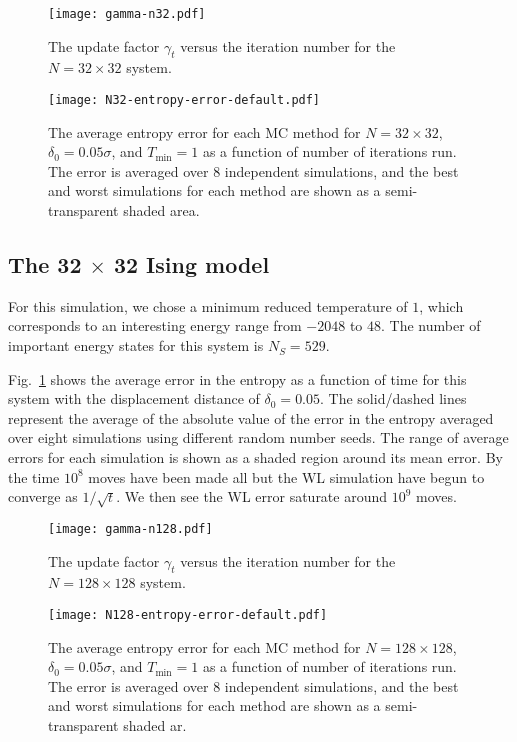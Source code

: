 \documentclass[letterpaper,twocolumn,amsmath,amssymb,pre,aps,10pt]{revtex4-1}
\begin{document}
\begin{figure}
\texttt{[image: gamma-n32.pdf]}
  \caption{
  The update factor $\gamma_t$ versus the iteration number for the $N=32 \times 32$
  system.}
\end{figure}

\begin{figure}
\texttt{[image: N32-entropy-error-default.pdf]}
  \caption{
  The average entropy error for each MC method for $N=32 \times 32$,
               $\delta_0 = 0.05\sigma$, and $T_{\min} = 1$
               as a function of number of iterations run.  The error is
               averaged over 8 independent simulations, and the best
               and worst simulations for each method are shown as a
               semi-transparent shaded area.}\label{fig:n32}
\end{figure}

\subsection{The 32 $\times$ 32 Ising model}
For this simulation, we chose a minimum reduced temperature of $1$, which
corresponds to an interesting energy range from $-2048$ to $48$.  The number of
important energy states for this system is $N_S = 529$.

Fig.~\ref{fig:n32} shows the average error in the entropy as a function of time for
this system with the displacement distance of $\delta_0 = 0.05$. The solid/dashed lines
represent the average of the absolute value of the error in the entropy averaged
over eight simulations using different random number seeds. The range of average
errors for each simulation is shown as a shaded region around its mean error. By
the time $10^8$ moves have been made all but the WL simulation have begun to
converge as $1/\sqrt{t}$. We then see the WL error saturate around $10^9$ moves.

\begin{figure}
\texttt{[image: gamma-n128.pdf]}
  \caption{
  The update factor $\gamma_t$ versus the iteration number for the $N=128 \times 128$
  system.}
\end{figure}

\begin{figure}
\texttt{[image: N128-entropy-error-default.pdf]}
  \caption{
  The average entropy error for each MC method for $N=128 \times 128$,
               $\delta_0 = 0.05\sigma$, and $T_{\min} = 1$
               as a function of number of iterations run.  The error is
               averaged over 8 independent simulations, and the best
               and worst simulations for each method are shown as a
               semi-transparent shaded ar.}\label{fig:n128}
\end{figure}
\end{document}
